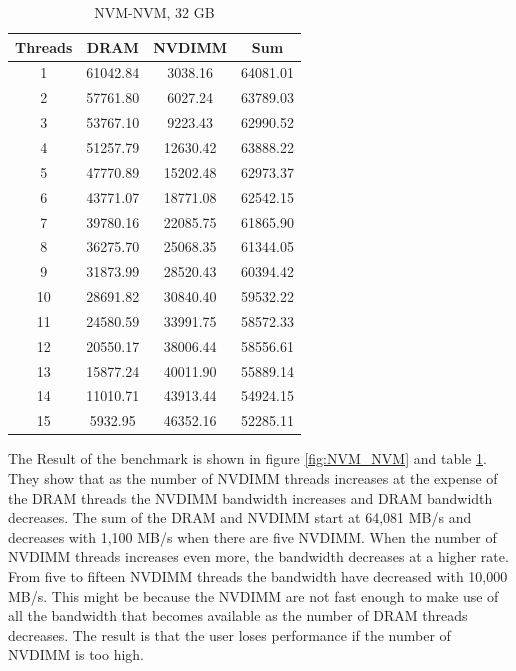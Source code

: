 \documentclass[12pt,a4paper,USenglish]{article}      %
\begin{document}
\begin{table}[!hbtp]
\begin{tabular}{ |c|c|c|c| } 
\hline
Threads & DRAM & NVDIMM & Sum \\
\hline
1 & 61042.84 & 3038.16 & 64081.01 \\
\hline
2 & 57761.80 & 6027.24 & 63789.03 \\
\hline
3 & 53767.10 & 9223.43 & 62990.52 \\
\hline
4 & 51257.79 & 12630.42 & 63888.22 \\
\hline
5 & 47770.89 & 15202.48 & 62973.37 \\
\hline
6 & 43771.07 & 18771.08 & 62542.15 \\
\hline
7 & 39780.16 & 22085.75 & 61865.90 \\
\hline
8 & 36275.70 & 25068.35 & 61344.05 \\
\hline
9 & 31873.99 & 28520.43 & 60394.42 \\
\hline
10 & 28691.82 & 30840.40 & 59532.22 \\
\hline
11 & 24580.59 & 33991.75 & 58572.33 \\
\hline
12 & 20550.17 & 38006.44 & 58556.61 \\
\hline
13 & 15877.24 & 40011.90 & 55889.14 \\
\hline
14 & 11010.71 & 43913.44 & 54924.15 \\
\hline
15 & 5932.95 & 46352.16 & 52285.11 \\
\hline
\end{tabular}
\caption{NVM-NVM, 32 GB}
\label{tab:NVM_NVM}
\end{table}

The Result of the benchmark is shown in figure \ref{fig:NVM_NVM} and table \ref{tab:NVM_NVM}. They show that as the number of NVDIMM threads increases at the expense of the DRAM threads the NVDIMM bandwidth increases and DRAM bandwidth decreases. 
The sum of the DRAM and NVDIMM start at 64,081 MB/s and decreases with 1,100 MB/s when there are five NVDIMM. When the number of NVDIMM threads increases even more, the bandwidth decreases at a  higher rate. From five to fifteen NVDIMM threads the bandwidth have decreased with 10,000 MB/s. This might be because the NVDIMM are not fast enough to make use of all the bandwidth that becomes available as the number of DRAM threads decreases. The result is that the user loses performance if the number of NVDIMM is too high.
\end{document}
